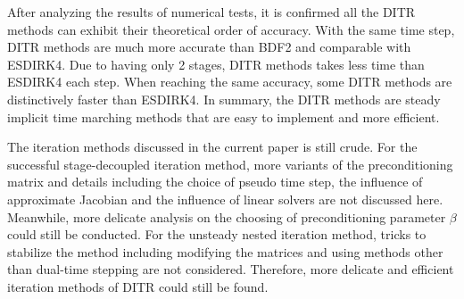 After analyzing the results of numerical tests, it is confirmed
all the DITR methods can exhibit their theoretical order of accuracy.
With the same time step, DITR methods are much more accurate than
BDF2 and comparable with ESDIRK4.
Due to having only 2 stages, DITR methods takes less time than ESDIRK4
each step.
When reaching the same accuracy, some DITR methods are
distinctively faster than ESDIRK4.
In summary, the DITR methods are steady implicit time marching methods
that are easy to implement and more efficient.

The iteration methods discussed in the current paper is still crude.
For the successful stage-decoupled iteration method,
more variants of the preconditioning matrix and details including
the choice of pseudo time step, the influence of approximate
Jacobian and the influence of linear solvers are not discussed here.
Meanwhile, more delicate analysis on the choosing of preconditioning parameter
$\beta$ could still be conducted.
For the unsteady nested iteration method,
tricks to stabilize the method including modifying the matrices and
using methods other than dual-time stepping are not considered.
Therefore, more delicate and efficient iteration methods of DITR could
still be found.